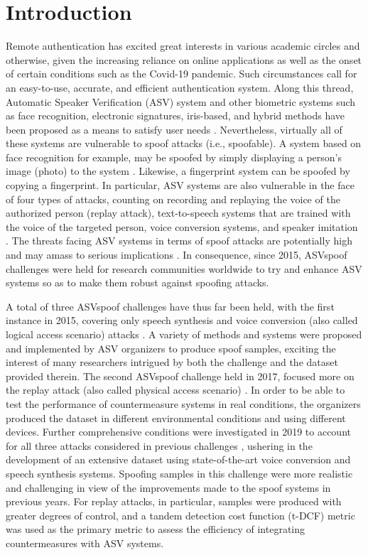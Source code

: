 \documentclass[a4paper]{article}
\begin{document}
\section{Introduction}
Remote authentication has excited great interests in various academic circles and otherwise, given the increasing reliance on online applications as well as the onset of certain conditions such as the Covid-19 pandemic. Such circumstances call for an easy-to-use, accurate, and efficient authentication system. Along this thread, Automatic Speaker Verification (ASV) system and other biometric systems such as face recognition, electronic signatures, iris-based, and hybrid methods have been proposed as a means to satisfy user needs \cite{1reynolds1995robust,2hansen2015speaker}. Nevertheless, virtually all of these systems are vulnerable to spoof attacks (i.e., spoofable). A system based on face recognition for example, may be spoofed by simply displaying a person's image (photo) to the system \cite{3hadid2015biometrics}. Likewise, a fingerprint system can be spoofed by copying a fingerprint. In particular, ASV systems are also vulnerable in the face of four types of attacks, counting on recording and replaying the voice of the authorized person (replay attack), text-to-speech systems that are trained with the voice of the targeted person, voice conversion systems, and speaker imitation \cite{4ergunay2015vulnerability}. The threats facing ASV systems in terms of spoof attacks are potentially high and may amass to serious implications \cite{5sahidullah2019introduction}. In consequence, since 2015, ASVspoof challenges were held for research communities worldwide to try and enhance ASV systems so as to make them robust against spoofing attacks. 

A total of three ASVspoof challenges have thus far been held, with the first instance in 2015, covering only speech synthesis and voice conversion (also called logical access scenario) attacks \cite{6wu2015asvspoof}. A variety of methods and systems were proposed and implemented by ASV organizers to produce spoof samples, exciting the interest of many researchers intrigued by both the challenge and the dataset provided therein. The second ASVspoof challenge held in 2017, focused more on the replay attack (also called physical access scenario) \cite{7delgado2018asvspoof,8kinnunen2017asvspoof}. In order to be able to test the performance of countermeasure systems in real conditions, the organizers produced the dataset in different environmental conditions and using different devices. Further comprehensive conditions were investigated in 2019 to account for all three attacks considered in previous challenges \cite{9todisco2019asvspoof}, ushering in the development of an extensive dataset using state-of-the-art voice conversion and speech synthesis systems. Spoofing samples in this challenge were more realistic and challenging in view of the improvements made to the spoof systems in previous years. For replay attacks, in particular, samples were produced with greater degrees of control, and a tandem detection cost function (t-DCF) metric was used as the primary metric to assess the efficiency of integrating countermeasures with ASV systems.
\end{document}
